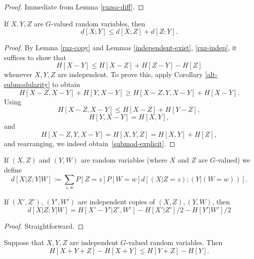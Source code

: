 \begin{proof}  Immediate from Lemma \ref{ruzsa-diff}.
\end{proof}

\begin{lemma}\label{ruzsa-triangle} If $X,Y,Z$ are $G$-valued random variables, then
$$ d[X;Y] \leq d[X;Z] + d[Z;Y].$$
\end{lemma}

\begin{proof} By Lemma \ref{ruz-copy} and Lemmas \ref{independent-exist}, \ref{ruz-indep}, it suffices to show that
\begin{equation}\label{submod-explicit} H[X - Y] \leq H[X-Z] + H[Z-Y] - H[Z]\end{equation}
whenever $X, Y, Z$ are independent. To prove this, apply Corollary \ref{alt-submodularity} to obtain
\[ H[X - Z, X - Y] + H[Y, X - Y] \geq H[X - Z, Y, X - Y] + H[X - Y].\]
Using
\[ H[X - Z, X - Y] \leq H[X - Z] + H[Y - Z],\]
\[ H[Y, X - Y] = H[X, Y], \] and
\[ H[X - Z, Y, X - Y] = H[X, Y, Z] = H[X, Y] + H[Z],\] and rearranging, we indeed obtain~\eqref{submod-explicit}.
\end{proof}

\begin{definition}\label{cond-dist-def}
If $(X, Z)$ and $(Y, W)$ are random variables (where $X$ and $Z$ are $G$-valued) we define
$$ d[X  | Z; Y | W] := \sum_{z,w} P[Z=z] P[W=w] d[(X|Z=z); (Y|(W=w))].$$
\end{definition}

\begin{lemma}\label{cond-dist-alt}  If $(X',Z')$, $(Y',W')$ are independent copies of $(X,Z), (Y,W)$, then
$$  d[X  | Z;Y | W] = H[X'-Y'|Z',W'] - H[X'|Z']/2 - H[Y'|W']/2$$
\end{lemma}

\begin{proof} Straightforward.
\end{proof}

\begin{lemma}\label{kv}
Suppose that $X, Y, Z$ are independent $G$-valued random variables. Then
\[
  H[X + Y + Z] - H[X + Y] \leq H[Y+Z] - H[Y].
\]
\end{lemma}

